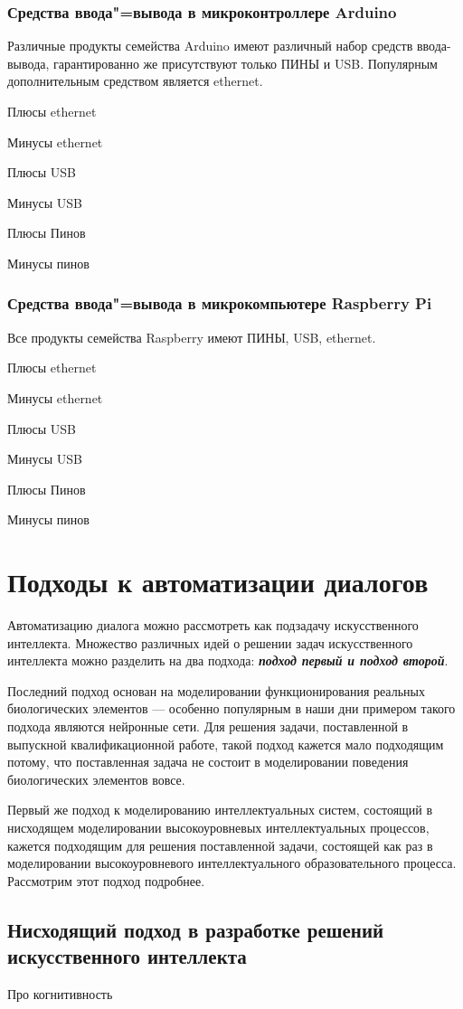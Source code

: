 \subsubsection{Средства ввода"=вывода в микроконтроллере Arduino}
Различные продукты семейства Arduino имеют различный набор средств ввода-вывода, гарантированно же присутствуют только ПИНЫ и USB. Популярным дополнительным средством является ethernet.

Плюсы ethernet

Минусы ethernet

Плюсы USB

Минусы USB

Плюсы Пинов

Минусы пинов

\subsubsection{Средства ввода"=вывода в микрокомпьютере Raspberry Pi}
Все продукты семейства Raspberry имеют ПИНЫ, USB, ethernet.

Плюсы ethernet

Минусы ethernet

Плюсы USB

Минусы USB

Плюсы Пинов

Минусы пинов

\section{Подходы к автоматизации диалогов}
Автоматизацию диалога можно рассмотреть как подзадачу искусственного интеллекта. Множество различных идей о решении задач искусственного интеллекта можно разделить на два подхода: \textbf{\textit{подход первый и подход второй}}.

Последний подход основан на моделировании функционирования реальных биологических элементов --- особенно популярным в наши дни примером такого подхода являются нейронные сети. Для решения задачи, поставленной в выпускной квалификационной работе, такой подход кажется мало подходящим потому, что поставленная задача не состоит в моделировании поведения биологических элементов вовсе.

Первый же подход к моделированию интеллектуальных систем, состоящий в нисходящем моделировании высокоуровневых интеллектуальных процессов, кажется подходящим для решения поставленной задачи, состоящей как раз в моделировании высокоуровневого интеллектуального образовательного процесса. Рассмотрим этот подход подробнее.

\subsection{Нисходящий подход в разработке решений искусственного интеллекта}

{\Large Про когнитивность}

